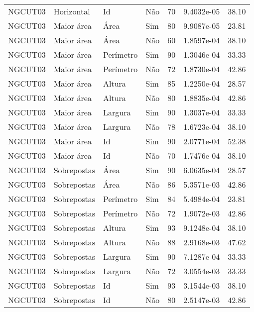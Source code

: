 \begin{tabular}{llllrrr}
NGCUT03   & Horizontal  & Id        & Não         & 70           & 9.4032e-05 & 38.10    \\
NGCUT03   & Maior área  & Área      & Sim         & 80           & 9.9087e-05 & 23.81    \\
NGCUT03   & Maior área  & Área      & Não         & 60           & 1.8597e-04 & 38.10    \\
NGCUT03   & Maior área  & Perímetro & Sim         & 90           & 1.3046e-04 & 33.33    \\
NGCUT03   & Maior área  & Perímetro & Não         & 72           & 1.8730e-04 & 42.86    \\
NGCUT03   & Maior área  & Altura    & Sim         & 85           & 1.2250e-04 & 28.57    \\
NGCUT03   & Maior área  & Altura    & Não         & 80           & 1.8835e-04 & 42.86    \\
NGCUT03   & Maior área  & Largura   & Sim         & 90           & 1.3037e-04 & 33.33    \\
NGCUT03   & Maior área  & Largura   & Não         & 78           & 1.6723e-04 & 38.10    \\
NGCUT03   & Maior área  & Id        & Sim         & 90           & 2.0771e-04 & 52.38    \\
NGCUT03   & Maior área  & Id        & Não         & 70           & 1.7476e-04 & 38.10    \\
NGCUT03   & Sobrepostas & Área      & Sim         & 90           & 6.0635e-04 & 28.57    \\
NGCUT03   & Sobrepostas & Área      & Não         & 86           & 5.3571e-03 & 42.86    \\
NGCUT03   & Sobrepostas & Perímetro & Sim         & 84           & 5.4984e-04 & 23.81    \\
NGCUT03   & Sobrepostas & Perímetro & Não         & 72           & 1.9072e-03 & 42.86    \\
NGCUT03   & Sobrepostas & Altura    & Sim         & 93           & 9.1248e-04 & 38.10    \\
NGCUT03   & Sobrepostas & Altura    & Não         & 88           & 2.9168e-03 & 47.62    \\
NGCUT03   & Sobrepostas & Largura   & Sim         & 90           & 7.1287e-04 & 33.33    \\
NGCUT03   & Sobrepostas & Largura   & Não         & 72           & 3.0554e-03 & 33.33    \\
NGCUT03   & Sobrepostas & Id        & Sim         & 93           & 3.1544e-03 & 38.10    \\
NGCUT03   & Sobrepostas & Id        & Não         & 80           & 2.5147e-03 & 42.86    \\
\hline
\end{tabular}